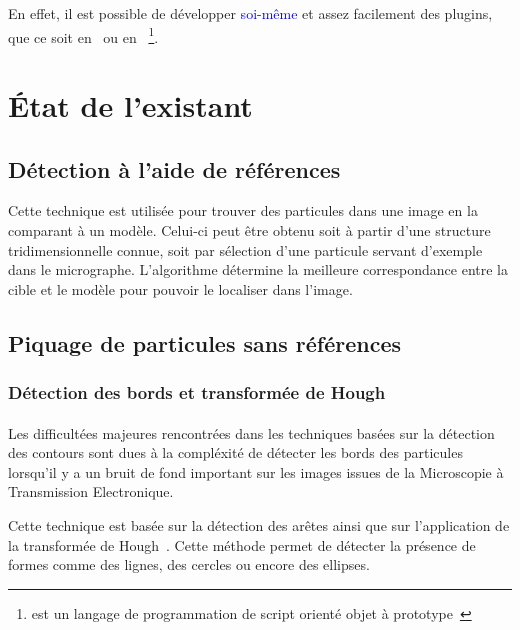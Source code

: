 \documentclass[11pt,a4paper]{report}
\begin{document}
\noindent
En effet, il est possible de développer \textcolor{blue}{soi-même} et assez facilement des plugins, que ce soit en \java\ ou en \js ~\footnote{\js est un langage de programmation de script orienté objet à prototype~\cite{javascript:url}}.
\section{\'Etat de l'existant}
\subsection{Détection à l'aide de références}
Cette technique est utilisée pour trouver des particules dans une image en la comparant à un modèle. Celui-ci peut \^etre obtenu soit à partir d'une structure tridimensionnelle connue, soit par sélection d'une particule servant d'exemple dans le micrographe. L'algorithme détermine la meilleure correspondance entre la cible et le modèle pour pouvoir le localiser dans l'image.%

\subsection{Piquage de particules sans références}
\subsubsection{Détection des bords et transformée de Hough}


\paragraph*{}
Les difficultées majeures rencontrées dans les techniques basées sur la détection des contours sont dues à la compléxité de détecter les bords des particules lorsqu'il y a un bruit de fond important sur les images issues de la Microscopie à Transmission Electronique.%

\noindent
Cette technique est basée sur la détection des arêtes ainsi que sur l'application de la transformée de Hough~\cite{PdetectEHT:article}. Cette méthode permet de détecter la présence de formes comme des lignes, des cercles ou encore des ellipses.%
\end{document}
